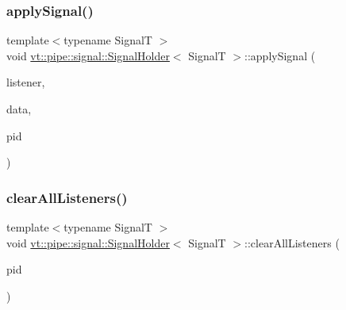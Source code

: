 \mbox{\label{structvt_1_1pipe_1_1signal_1_1_signal_holder_a611fe4b2ce38900245e2f4a9dd40d5dc}} 
\subsubsection{\texorpdfstring{apply\+Signal()}{applySignal()}}
{\footnotesize\ttfamily template$<$typename SignalT $>$ \\
void \hyperlink{structvt_1_1pipe_1_1signal_1_1_signal_holder}{vt\+::pipe\+::signal\+::\+Signal\+Holder}$<$ SignalT $>$\+::apply\+Signal (\begin{DoxyParamCaption}\item[{\hyperlink{structvt_1_1pipe_1_1signal_1_1_signal_holder_a68114d1ad5804c71e014736b18e41e08}{Listener\+Ptr\+Type}}]{listener,  }\item[{\hyperlink{structvt_1_1pipe_1_1signal_1_1_signal_holder_aad5bfc2b46dfa071ae638385324d7e31}{Data\+Ptr\+Type}}]{data,  }\item[{\hyperlink{namespacevt_ac9852acda74d1896f48f406cd72c7bd3}{Pipe\+Type} const \&}]{pid }\end{DoxyParamCaption})}

\mbox{\label{structvt_1_1pipe_1_1signal_1_1_signal_holder_a5ef82532eb8d0d65fe7b07f7fb53491d}} 
\subsubsection{\texorpdfstring{clear\+All\+Listeners()}{clearAllListeners()}}
{\footnotesize\ttfamily template$<$typename SignalT $>$ \\
void \hyperlink{structvt_1_1pipe_1_1signal_1_1_signal_holder}{vt\+::pipe\+::signal\+::\+Signal\+Holder}$<$ SignalT $>$\+::clear\+All\+Listeners (\begin{DoxyParamCaption}\item[{\hyperlink{namespacevt_ac9852acda74d1896f48f406cd72c7bd3}{Pipe\+Type} const \&}]{pid }\end{DoxyParamCaption})}

